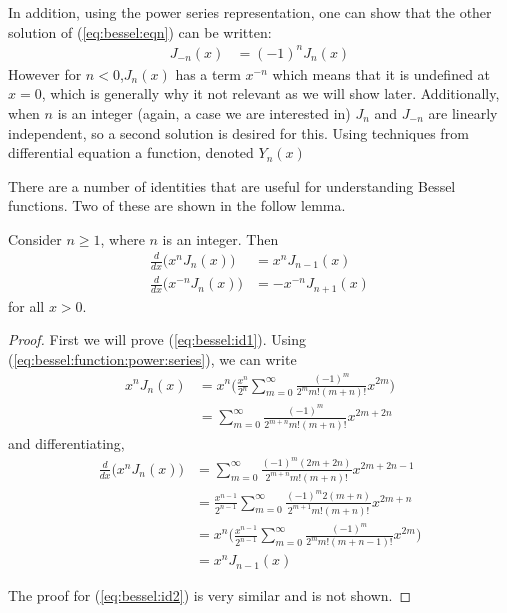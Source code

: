 In addition, using the power series representation, one can show that the other solution of (\ref{eq:bessel:eqn}) can be written:
\begin{align*}
J_{-n}(x) & = (-1)^n J_n(x)
\end{align*}
However for $n<0$,$J_n(x)$ has a term $x^{-n}$ which means that it is undefined at $x=0$, which is generally why it not relevant as we will show later.  Additionally, when $n$ is an integer (again, a case we are interested in) $J_n$ and $J_{-n}$ are linearly independent, so a second solution is desired for this.  Using techniques from differential equation a function, denoted $Y_n(x)$

There are a number of identities that are useful for understanding Bessel functions.  Two of these are shown in the follow lemma.

\begin{lemma} \label{lem:bessel:identities}
Consider $n\geq 1$, where $n$ is an integer.  Then
%
\begin{align}
\frac{d}{dx} \bigl( x^n J_n(x) \bigr) & = x^n J_{n-1} (x) \label{eq:bessel:id1}\\
\frac{d}{dx} \bigl( x^{-n} J_n(x) \bigr) & = -x^{-n} J_{n+1} (x)\label{eq:bessel:id2}
\end{align}
for all $x>0$.
\end{lemma}
\begin{proof}
First we will prove (\ref{eq:bessel:id1}).  Using (\ref{eq:bessel:function:power:series}), we can write
%
\begin{align*}
x^nJ_n(x) & = x^n \biggl( \frac{x^{n}}{2^{n}} \sum_{m=0}^{\infty} \frac{(-1)^m}{2^m m! (m+n)!} x^{2m} \biggr) \\\
& = \sum_{m=0}^{\infty} \frac{(-1)^m}{2^{m+n} m! (m+n)!} x^{2m+2n}
\end{align*}
and differentiating,
\begin{align*}
\frac{d}{dx} \bigl(x^nJ_n(x)\bigr) & =  \sum_{m=0}^{\infty} \frac{(-1)^m(2m+2n)}{2^{m+n} m! (m+n)!} x^{2m+2n-1} \\
& = \frac{x^{n-1}}{2^{n-1}}  \sum_{m=0}^{\infty} \frac{(-1)^m2(m+n)}{2^{m+1} m! (m+n)!} x^{2m+n} \\
& = x^n \biggl(\frac{x^{n-1}}{2^{n-1}}  \sum_{m=0}^{\infty} \frac{(-1)^m}{2^{m} m! (m+n-1)!} x^{2m}) \\
&  = x^{n} J_{n-1}(x)
\end{align*}

The proof for (\ref{eq:bessel:id2}) is very similar and is not shown.
\end{proof}


